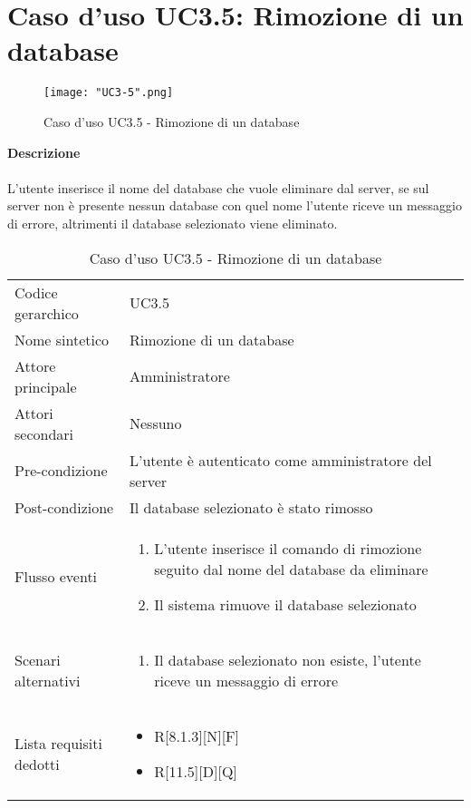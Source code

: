 \documentclass[a4paper]{report}
\begin{document}
	\section{Caso d'uso UC3.5: Rimozione di un database}
	 	\begin{figure}[H]
			\centering
			\texttt{[image: "UC3-5".png]}
			\caption{Caso d'uso UC3.5 - Rimozione di un database}
		\end{figure}
	 \textbf{Descrizione} \\ \\
	 L'utente inserisce il nome del database che vuole eliminare dal server, se sul server non è 
	 presente nessun database con quel nome l'utente riceve un messaggio di errore, altrimenti il database
	 selezionato viene eliminato.
		\begin{table}[H]
		\begin{tabularx}{\textwidth}{X | X}\toprule
			\rowcolor{orange!65}Codice gerarchico & UC3.5 \\
			Nome sintetico & Rimozione di un database \\
			\rowcolor{orange!65}Attore principale & Amministratore\\
			Attori secondari & Nessuno \\
			\rowcolor{orange!65}Pre-condizione & L'utente è autenticato come amministratore del server\\
			Post-condizione & Il database selezionato è stato rimosso \\
			\rowcolor{orange!65}Flusso eventi & \begin{enumerate}
			\item L'utente inserisce il comando di rimozione seguito dal nome del database da eliminare
			\item Il sistema rimuove il database selezionato
			\end{enumerate} \\
			Scenari alternativi & \begin{enumerate}
			\item Il database selezionato non esiste, l'utente riceve un messaggio di errore
			\end{enumerate} \\
			\rowcolor{orange!65}Lista requisiti dedotti & \begin{itemize}
				\item R[8.1.3][N][F]
				\item R[11.5][D][Q]
				\end{itemize} \\
			\bottomrule
		\end{tabularx}
		\caption{Caso d'uso UC3.5 - Rimozione di un database}
	 \end{table}
\end{document}
